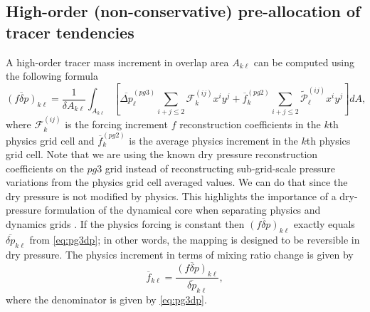 

\subsection{High-order (non-conservative) pre-allocation of tracer tendencies}
A high-order tracer mass increment in overlap area $A_{k\ell}$ can be computed using the following formula
\begin{equation}
\label{eq:mp3}
\overline{\left( f\delta p\right)}_{k\ell}=\frac{1}{\delta A_{k\ell}}\int_{A_{k\ell}}\left[ \overline{\Delta p}_\ell^{(pg3)}\sum_{i+j\le 2}{\mathcal{F}}^{(ij)}_k x^{i}y^{j}+{\overline{f}}_k^{(pg2)}\sum_{i+j\le 2}{\widetilde{{\mathcal{P}}}}^{(ij)}_\ell x^{i}y^{j}\right] dA,
\end{equation}
where $\mathcal{F}^{(ij)}_k$ is the forcing increment $f$ reconstruction coefficients in the $k$th physics grid cell and ${\overline{f}}_k^{(pg2)}$ is the average physics increment in the $k$th physics grid cell. Note that we are using the known dry pressure reconstruction coefficients on the $pg3$ grid instead of reconstructing sub-grid-scale pressure variations from the physics grid cell averaged values. We can do that since the dry pressure is not modified by physics. This highlights the importance of a dry-pressure formulation of the dynamical core when separating physics and dynamics grids \citep{LetAl2018JAMES}. If the physics forcing is constant then $\overline{\left( f\delta p\right)}_{k\ell}$ exactly equals $\overline{\delta p}_{k\ell}$ from \eqref{eq:pg3dp}; in other words, the mapping is designed to be reversible in dry pressure. The physics increment in terms of mixing ratio change is given by
\begin{equation}
\label{eq:pg3fq}
\overline{f}_{k\ell}=\frac{\overline{\left( f\delta p\right)}_{k\ell}}{\overline{\delta p}_{k\ell}},
\end{equation}
where the denominator is given by \eqref{eq:pg3dp}.

